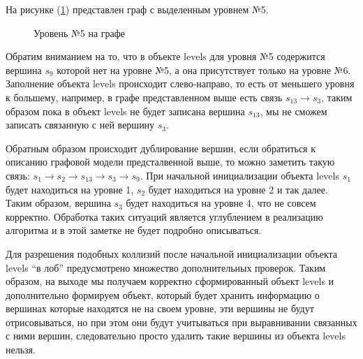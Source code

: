 На рисунке (\ref{fig:main_graph_level5}) представлен граф с выделенным уровнем №5.

\begin{figure}[ht!]
\caption{Уровень №5 на графе}
\label{fig:main_graph_level5}
\end{figure}

Обратим вниманием на то, что в объекте levels для уровня №5 содержится вершина $s_9$ которой нет на уровне №5, а она присутствует только на уровне №6. Заполнение объекта levels происходит слево-направо, то есть от меньшего
уровня к большему, например, в графе представленном выше есть связь $s_{13} \rightarrow s_3$, таким образом пока в объект levels не будет записана вершина $s_{13}$, мы не сможем записать связанную с ней вершину $s_3$.

Обратным образом происходит дублирование вершин, если обратиться к описанию графовой модели предсталвенной выше, то можно заметить такую связь: $s_1 \rightarrow s_2 \rightarrow s_{13} \rightarrow s_3 \rightarrow s_9$. При начальной инициализации объекта levels $s_1$ будет находиться на уровне 1, $s_2$ будет находиться на уровне 2 и так далее. Таким образом, вершина $s_3$ будет находиться на уровне 4, что не совсем корректно. Обработка таких ситуаций является углублением в реализацию алгоритма и в этой заметке не будет подробно описываться.

Для разрешения подобных коллизий после начальной инициализации объекта levels ``в лоб'' предусмотрено множество дополнительных проверок. Таким образом, на выходе мы получаем корректно сформированный объект levels и дополнительно формируем объект, который будет хранить информацию о вершинах которые находятся не на своем уровне, эти вершины не будут отрисовываться, но при этом они будут учитываться при выравнивании связанных с ними вершин, следовательно просто удалить такие вершины из объекта levels нельзя.

